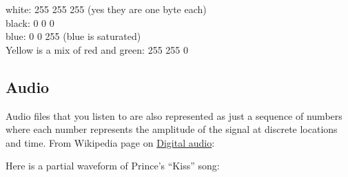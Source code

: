 \documentclass[titlepage]{tufte-book}
\begin{document}
\begin{fullwidth}
white: 255 255 255  (yes they are one byte each) \\
black: 0 0 0\\
blue: 0 0 255 (blue is saturated)\\
Yellow is a mix of red and green: 255 255 0


\subsection{Audio}

Audio files that you listen to are also represented as just a sequence of numbers where each number represents the amplitude of the signal at discrete locations and time. From Wikipedia page on \href{https://en.wikipedia.org/wiki/Digital_audio}{Digital audio}:


Here is a partial waveform of Prince's ``Kiss'' song:



\end{fullwidth}
\end{document}
